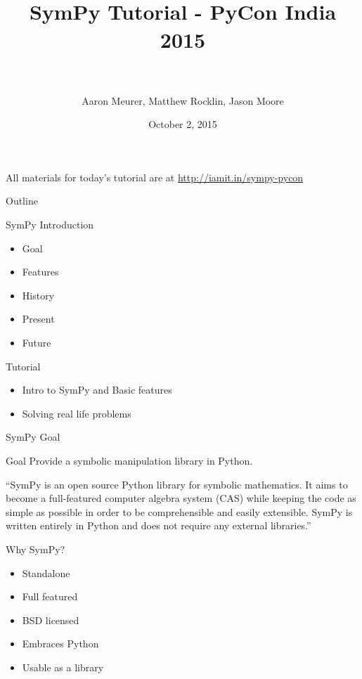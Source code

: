 \documentclass[xcolor=svgnames]{beamer}
\title[SymPy\hspace{4em}\insertframenumber/
  \inserttotalframenumber]{~\\ SymPy Tutorial - PyCon India 2015\\~}
\author[A. Meurer, Matthew Rocklin, Jason Moore]
  {Aaron Meurer, Matthew Rocklin, Jason Moore}
\institute{\pgfuseimage{mylogo}}
\date{October 2, 2015}
\begin{document}
  \begin{frame}
    \maketitle
  \begin{center}
  \normalsize All materials for today's tutorial are at \url{http://iamit.in/sympy-pycon}
  \end{center}
  \end{frame}
  
  \begin{frame}{Outline}
    \begin{block}{SymPy Introduction}
      \begin{itemize}
      \item Goal
      \item Features
      \item History
      \item Present
      \item Future
      \end{itemize}
    \end{block}

    \begin{block}{Tutorial}
      \begin{itemize}
      \item Intro to SymPy and Basic features
      \item Solving real life problems
      \end{itemize}
    \end{block}
  \end{frame}

  \begin{frame}{SymPy Goal}
    \begin{block}{Goal}
      Provide a symbolic manipulation library in Python.
    \end{block}
    \begin{block}

      ``SymPy is an open source Python library for symbolic mathematics. It aims to
      become a full-featured computer algebra system (CAS) while keeping the code as
      simple as possible in order to be comprehensible and easily extensible. SymPy
      is written entirely in Python and does not require any external libraries.''

    \end{block}
  \end{frame}

  \begin{frame}{Why SymPy?}
    \begin{block}{}
      \begin{itemize}
        \item Standalone
        \item Full featured
        \item BSD licensed
        \item Embraces Python
        \item Usable as a library
      \end{itemize}
    \end{block}
  \end{frame}
\end{document}
